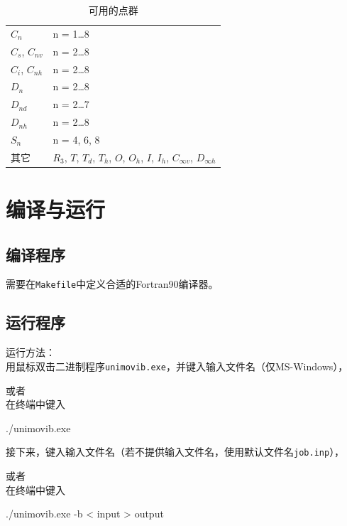 \documentclass[12pt,a4paper,openany,twoside,cap]{ctexbook}
\begin{document}
\begin{table}[!htbp]
\caption{可用的点群}\label{tab:symm}
\small\centering
\begin{tabular}{ll}
\hline\hline
$C_{n}$           & n = 1\ldots 8 \\
$C_s$, $C_{nv}$   & n = 2\ldots 8 \\
$C_i$, $C_{nh}$   & n = 2\ldots 8 \\
$D_{n}$           & n = 2\ldots 8 \\
$D_{nd}$          & n = 2\ldots 7 \\
$D_{nh}$          & n = 2\ldots 8 \\
$S_{n}$           & n = 4, 6, 8 \\
其它            & $R_3$, $T$, $T_d$, $T_h$, $O$, $O_h$, $I$, $I_h$, $C_{\infty v}$, $D_{\infty h}$ \\
\hline\hline
\end{tabular}
\end{table}


\chapter{编译与运行} \label{part:setting}

\section{编译程序} \label{sec:install}

需要在\verb|Makefile|中定义合适的Fortran90编译器。


\section{运行程序} \label{sec:run}

运行方法：\\
用鼠标双击二进制程序\verb|unimovib.exe|，并键入输入文件名（仅MS-Windows），

或者 \\
在终端中键入
\begin{commandshell}
./unimovib.exe
\end{commandshell}
\noindent 接下来，键入输入文件名（若不提供输入文件名，使用默认文件名\verb|job.inp|），

或者 \\
在终端中键入
\begin{commandshell}
./unimovib.exe -b < input > output
\end{commandshell}
\end{document}
